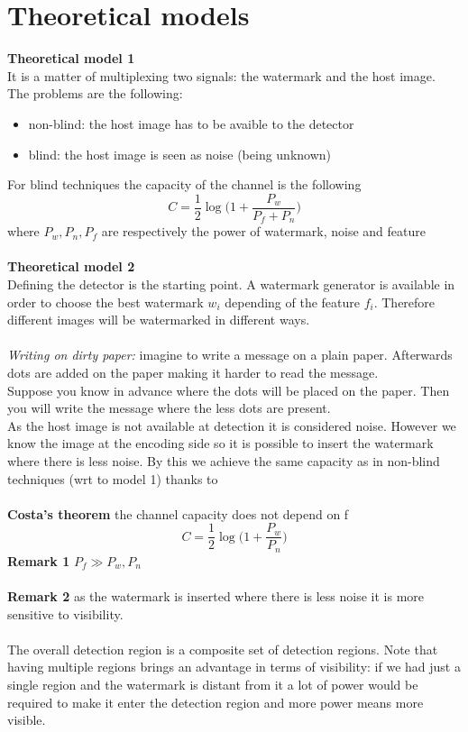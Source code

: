 \documentclass[10pt,a4paper]{book}
\begin{document}
\section{Theoretical models}
\textbf{Theoretical model 1}\\
It is a matter of multiplexing two signals: the watermark and the host image.\\
The problems are the following:
\begin{itemize}
\item non-blind: the host image has to be avaible to the detector
\item blind: the host image is seen as noise (being unknown)
\end{itemize}
For blind techniques the capacity of the channel is the following
$$ C = \frac{1}{2} \log \big ( 1+\frac{P_w}{P_f + P_n} \big )$$
where $P_w,P_n,P_f$ are respectively the power of watermark, noise and feature\\\\
\textbf{Theoretical model 2}\\
Defining the detector is the starting point. A watermark generator is available in order to choose the best watermark $w_i$ depending of the feature $f_i$. Therefore different images will be watermarked in different ways.\\\\
\emph{Writing on dirty paper:} imagine to write a message on a plain paper. Afterwards dots are added on the paper making it harder to read the message.\\
Suppose you know in advance where the dots will be placed on the paper. Then you will write the message where the less dots are present.\\
As the host image is not available at detection it is considered noise. However we know the image at the encoding side so it is possible to insert the watermark where there is less noise. By this we achieve the same capacity as in non-blind techniques (wrt to model 1) thanks to\\\\
\textbf{Costa's theorem} the channel capacity does not depend on f
$$ C = \frac{1}{2} \log \big ( 1+\frac{P_w}{P_n} \big )$$
\textbf{Remark 1} $P_f \gg P_w,P_n$\\\\
\textbf{Remark 2} as the watermark is inserted where there is less noise it is more sensitive to visibility.\\\\
The overall detection region is a composite set of detection regions. Note that having multiple regions brings an advantage in terms of visibility: if we had just a single region and the watermark is distant from it a lot of power would be required to make it enter the detection region and more power means more visible.
\end{document}
